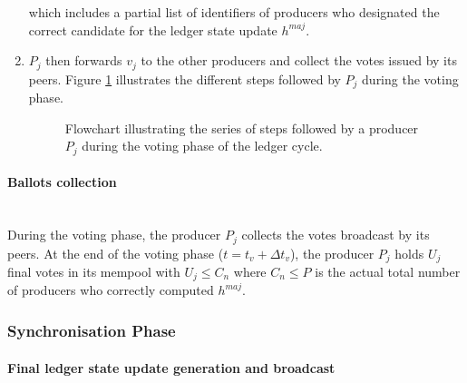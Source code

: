 \begin{enumerate}
which includes a partial list of identifiers of producers who designated the correct candidate for the ledger state update $h^{maj}$. 

\item $P_j$ then forwards $v_j$  to the other producers and collect the votes issued by its peers. Figure \ref{fig:Vot} illustrates the different steps followed by $P_j$ during the voting phase.
\begin{figure}[H]
\label{fig:Vot}
\caption{\label{fig:Vot}Flowchart illustrating the series of steps followed by a producer $P_j$ during the voting phase of the ledger cycle.}
\end{figure}
\end{enumerate}


\paragraph{Ballots collection}\mbox{}\\
During the voting phase, the producer $P_j$  collects the votes broadcast by its peers. At the end of the voting phase ($t = t_v+\Delta t_{v}$), the producer $P_j$ holds $U_j$ final votes in its mempool with $U_j \leq C_n$ where $C_n \leq P$ is the actual total number of producers who correctly computed $h^{maj}$.  


\subsubsection{Synchronisation Phase}
\paragraph{Final ledger state update generation and broadcast}\mbox{}\\

